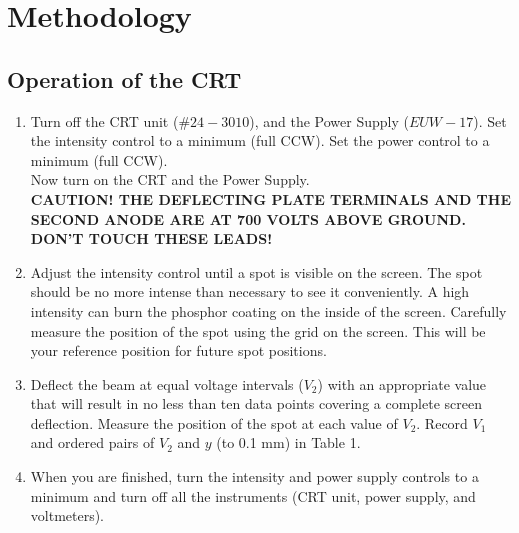 \documentclass[twocolumn,english,amsmath,amssymb]{IEEEtran}
\theoremstyle{plain}
\theoremstyle{plain}
\begin{document}
\section{Methodology}

\subsection{Operation of the CRT}
\begin{enumerate}
 \item Turn off the CRT unit ($\#24-3010$), and the Power Supply ($EUW-17$). Set the intensity control to a minimum (full CCW).  Set the power control to a minimum (full CCW). \\

 Now turn on the CRT and the Power Supply. \\

 \textbf{CAUTION!  THE DEFLECTING PLATE TERMINALS AND THE SECOND ANODE ARE AT 700 VOLTS ABOVE GROUND.  DON'T TOUCH THESE LEADS!} \\

 \item
 Adjust the intensity control until a spot is visible on the screen.  The spot should be no more intense than necessary to see it conveniently.  A high intensity can burn the phosphor coating on the inside of the screen.  Carefully measure the position of the spot using the grid on the screen.  This will be your reference position for future spot positions. \\

 \item Deflect the beam at equal voltage intervals ($V_2$) with an appropriate value that will result in no less than ten data points covering a complete screen deflection. Measure the position of the spot at each value of $V_2$.  Record $V_1$ and ordered pairs of $V_2$ and $y$ (to 0.1 mm) in Table 1. \\

 \item When you are finished, turn the intensity and power supply controls to a minimum and turn off all the instruments (CRT unit, power supply, and voltmeters). \\
\end{enumerate}
\end{document}
